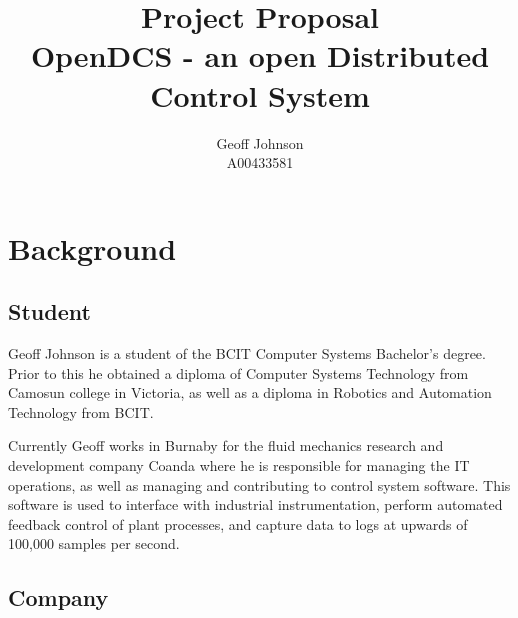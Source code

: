 \documentclass[11pt]{article}
\begin{document}
\nocite{*}

  \title{%
    Project Proposal \\
    OpenDCS - an open Distributed Control System
  }

  \author{%
    Geoff Johnson \\
    A00433581 %
  }

  \renewcommand{\today}{April 1, 2016}
  \maketitle
  \thispagestyle{empty}
  \newpage
  \mbox{}
  \thispagestyle{empty}

  \newpage
  \addtocounter{page}{-1}
  \tableofcontents

  \newpage


  \section{Background}\label{sec:bg}

    \subsection{Student}\label{sec:bg-student}

      Geoff Johnson is a student of the BCIT Computer Systems Bachelor's degree.
      Prior to this he obtained a diploma of Computer Systems Technology from
      Camosun college in Victoria, as well as a diploma in Robotics and Automation
      Technology from BCIT.

      Currently Geoff works in Burnaby for the fluid mechanics research and
      development company Coanda where he is responsible for managing the IT
      operations, as well as managing and contributing to control system
      software. This software is used to interface with industrial instrumentation,
      perform automated feedback control of plant processes, and capture data
      to logs at upwards of 100,000 samples per second.

    \subsection{Company}\label{sec:bg-company}
\end{document}

